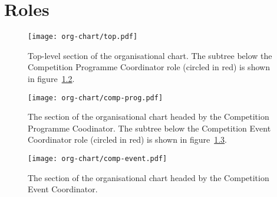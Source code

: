 \chapter{Roles}

\begin{landscape}
  \begin{figure}
    \begin{center}
      \texttt{[image: org-chart/top.pdf]}
    \end{center}
    \caption{\label{fig:org-chart-top}Top-level section of the organisational chart.  The subtree below the Competition Programme Coordinator role (circled in red) is shown in figure~\ref{fig:org-chart-prog}.}
  \end{figure}
\end{landscape}

\begin{landscape}
  \begin{figure}
    \begin{center}
      \texttt{[image: org-chart/comp-prog.pdf]}
    \end{center}
    \caption{\label{fig:org-chart-prog}The section of the organisational chart headed by the Competition Programme Coodinator.  The subtree below the Competition Event Coordinator role (circled in red) is shown in figure~\ref{fig:org-chart-event}.}
  \end{figure}
\end{landscape}

\begin{landscape}
  \begin{figure}
    \begin{center}
      \texttt{[image: org-chart/comp-event.pdf]}
    \end{center}
    \caption{\label{fig:org-chart-event}The section of the organisational chart headed by the Competition Event Coordinator.}
  \end{figure}
\end{landscape}
